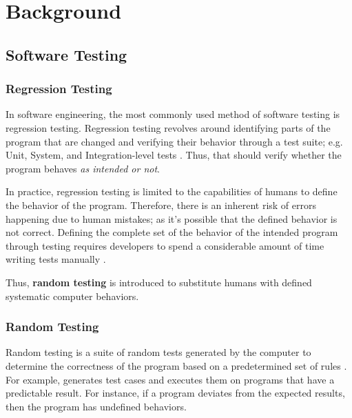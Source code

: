 \section{Background}
%

\subsection{Software Testing}
\label{sec:Testing}

\subsubsection{Regression Testing}

In software engineering, the most commonly used method of software testing is regression testing. Regression testing revolves around 
identifying parts of the program that are changed and verifying their behavior through a test suite; e.g. Unit, System, and Integration-level tests
\cite{testing}. Thus, that should verify whether the program behaves \emph{as intended or not}.

In practice, regression testing is limited to the capabilities of humans to define the behavior of the program. Therefore, there is an inherent 
risk of errors happening due to human mistakes; as it's possible that the defined behavior is not correct. Defining the complete set of the behavior 
of the intended program through testing requires developers to spend a considerable amount of time writing tests manually \cite{differentialTesting}. 

Thus, \textbf{random testing} is introduced to substitute humans with defined systematic computer behaviors.

\subsubsection{Random Testing}

Random testing is a suite of random tests generated by the computer to determine the correctness of the program based on a predetermined 
set of rules \cite{differentialTesting}. For example, \cite[Sec. 2]{randomTesting} generates test cases and 
executes them on programs that have a predictable result. For instance, if a program deviates from the expected results, then the 
program has undefined behaviors.

